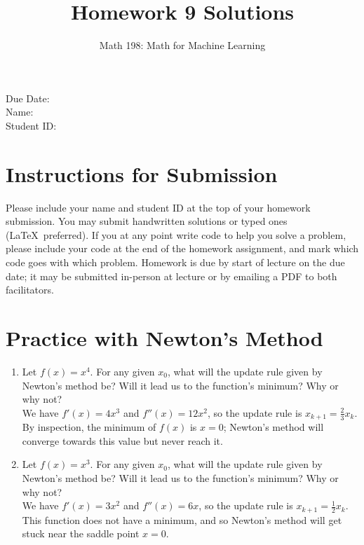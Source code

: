 \documentclass{article}
\title{Homework 9 Solutions}
\author{Math 198: Math for Machine Learning}
\date{}
\begin{document}
\maketitle

\noindent
Due Date:  \\
Name: \\
Student ID:

\section*{Instructions for Submission}
Please include your name and student ID at the top of your homework submission. You may submit handwritten solutions or typed ones (\LaTeX\ preferred). If you at any point write code to help you solve a problem, please include your code at the end of the homework assignment, and mark which code goes with which problem. Homework is due by start of lecture on the due date; it may be submitted in-person at lecture or by emailing a PDF to both facilitators.

\section{Practice with Newton's Method}
\begin{enumerate}[label=\arabic*.]
\item Let $f(x) = x^4$. For any given $x_0$, what will the update rule given by Newton's method be? Will it lead us to the function's minimum? Why or why not? \\
{\color{blue} We have $f'(x) = 4x^3$ and $f''(x) = 12x^2$, so the update rule is $x_{k+1} = \frac{2}{3}x_k$. By inspection, the minimum of $f(x)$ is $x=0$; Newton's method will converge towards this value but never reach it.}
\item Let $f(x) = x^3$. For any given $x_0$, what will the update rule given by Newton's method be? Will it lead us to the function's minimum? Why or why not? \\
{\color{blue} We have $f'(x) = 3x^2$ and $f''(x) = 6x$, so the update rule is $x_{k+1} = \frac{1}{2}x_k$. This function does not have a minimum, and so Newton's method will get stuck near the saddle point $x=0$.}
\end{enumerate}
\end{document}
